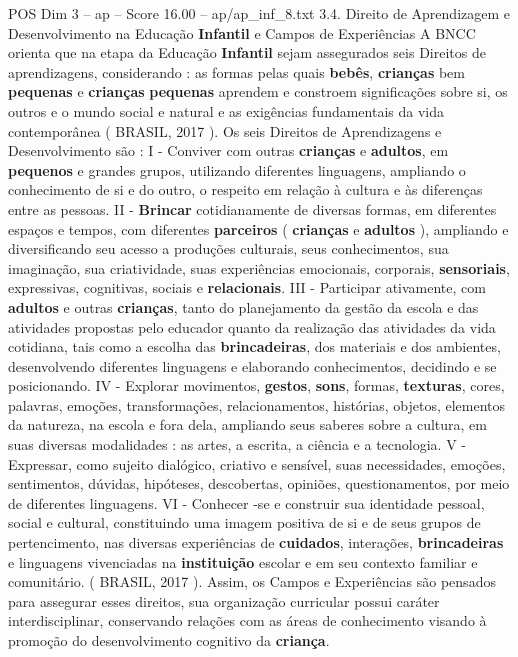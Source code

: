 \begin{textsample}{POS Dim 3 – ap – Score 16.00 – ap/ap\_inf\_8.txt}  \label{ex:f3_pos_190}
3.4.
Direito de Aprendizagem e Desenvolvimento na Educação \textbf{Infantil} e Campos de Experiências A BNCC orienta que na etapa da Educação \textbf{Infantil} sejam assegurados seis Direitos de aprendizagens, considerando : as formas pelas quais \textbf{bebês}, \textbf{crianças} bem \textbf{pequenas} e \textbf{crianças} \textbf{pequenas} aprendem e constroem significações sobre si, os outros e o mundo social e natural e as exigências fundamentais da vida contemporânea ( BRASIL, 2017 ).
Os seis Direitos de Aprendizagens e Desenvolvimento são : I - Conviver com outras \textbf{crianças} e \textbf{adultos}, em \textbf{pequenos} e grandes grupos, utilizando diferentes linguagens, ampliando o conhecimento de si e do outro, o respeito em relação à cultura e às diferenças entre as pessoas.
II - \textbf{Brincar} cotidianamente de diversas formas, em diferentes espaços e tempos, com diferentes \textbf{parceiros} ( \textbf{crianças} e \textbf{adultos} ), ampliando e diversificando seu acesso a produções culturais, seus conhecimentos, sua imaginação, sua criatividade, suas experiências emocionais, corporais, \textbf{sensoriais}, expressivas, cognitivas, sociais e \textbf{relacionais}.
III - Participar ativamente, com \textbf{adultos} e outras \textbf{crianças}, tanto do planejamento da gestão da escola e das atividades propostas pelo educador quanto da realização das atividades da vida cotidiana, tais como a escolha das \textbf{brincadeiras}, dos materiais e dos ambientes, desenvolvendo diferentes linguagens e elaborando conhecimentos, decidindo e se posicionando.
IV - Explorar movimentos, \textbf{gestos}, \textbf{sons}, formas, \textbf{texturas}, cores, palavras, emoções, transformações, relacionamentos, histórias, objetos, elementos da natureza, na escola e fora dela, ampliando seus saberes sobre a cultura, em suas diversas modalidades : as artes, a escrita, a ciência e a tecnologia.
V - Expressar, como sujeito dialógico, criativo e sensível, suas necessidades, emoções, sentimentos, dúvidas, hipóteses, descobertas, opiniões, questionamentos, por meio de diferentes linguagens.
VI - Conhecer -se e construir sua identidade pessoal, social e cultural, constituindo uma imagem positiva de si e de seus grupos de pertencimento, nas diversas experiências de \textbf{cuidados}, interações, \textbf{brincadeiras} e linguagens vivenciadas na \textbf{instituição} escolar e em seu contexto familiar e comunitário. ( BRASIL, 2017 ).
Assim, os Campos e Experiências são pensados para assegurar esses direitos, sua organização curricular possui caráter interdisciplinar, conservando relações com as áreas de conhecimento visando à promoção do desenvolvimento cognitivo da \textbf{criança}.

\end{textsample}
